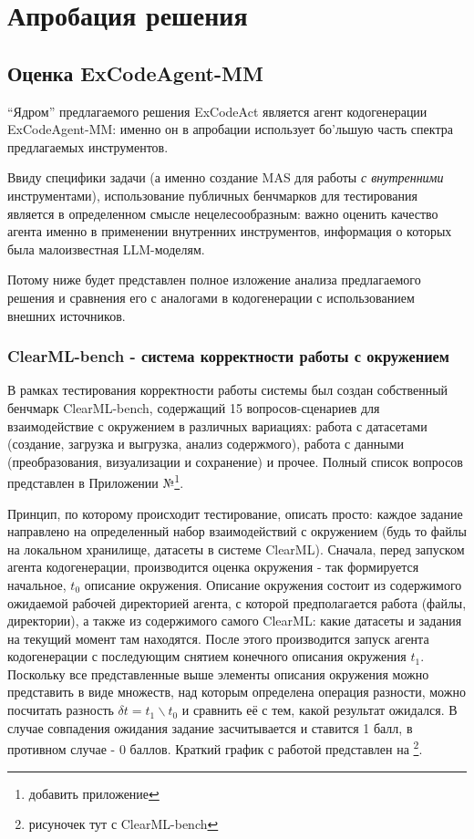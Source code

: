\chapter{Апробация решения} \label{ch4}

\section{Оценка ExCodeAgent-MM} \label{ch4:sec1}

``Ядром'' предлагаемого решения ExCodeAct является агент кодогенерации ExCodeAgent-MM:
именно он в апробации использует бо'льшую часть спектра предлагаемых инструментов. 

Ввиду специфики задачи (а именно создание MAS для работы \textit{с внутренними} 
инструментами), использование публичных бенчмарков для тестирования является в определенном
смысле нецелесообразным: важно оценить качество агента именно в применении внутренних
инструментов, информация о которых была малоизвестная LLM-моделям.

Потому ниже будет представлен полное изложение анализа предлагаемого решения и сравнения
его с аналогами в кодогенерации с использованием внешних источников.

\subsection{ClearML-bench - система корректности работы с окружением} \label{ch4:sec1:subsec1}

В рамках тестирования корректности работы системы был создан собственный  
бенчмарк ClearML-bench, содержащий 15 вопросов-сценариев для взаимодействие 
с окружением в различных вариациях: работа с датасетами (создание, загрузка и выгрузка, 
анализ содержмого), работа с данными (преобразования, визуализации и сохранение) и прочее.
Полный список вопросов представлен в Приложении №\footnote{добавить приложение}. 

Принцип, по которому происходит тестирование, описать просто: каждое задание направлено на 
определенный набор взаимодействий с окружением (будь то файлы на локальном
хранилище, датасеты в системе ClearML). Сначала, перед запуском агента кодогенерации,
производится оценка окружения - так формируется начальное, $t_0$ описание окружения. 
Описание окружения состоит из содержимого ожидаемой рабочей директорией агента, с которой
предполагается работа (файлы, директории), а также из содержимого самого ClearML: какие
датасеты и задания на текущий момент там находятся. После этого производится запуск
агента кодогенерации с последующим снятием конечного описания окружения $t_1$. Поскольку
все представленные выше элементы описания окружения можно представить в виде множеств,
над которым определена операция разности, можно посчитать разность 
$\delta t = t_1 \backslash t_0$ и сравнить её с тем, какой результат ожидался. В случае
совпадения ожидания задание засчитывается и ставится 1 балл, в противном случае - 0 баллов.
Краткий график с работой представлен на \footnote{рисуночек тут с ClearML-bench}.

